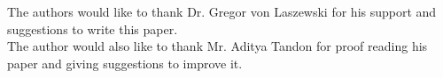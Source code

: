 \documentclass[sigconf]{acmart}
\begin{document}
\begin{acks}

The authors would like to thank Dr. Gregor von Laszewski for his support and suggestions to write this paper.
\\
The author would also like to thank Mr. Aditya Tandon for proof reading his paper and giving suggestions to improve it.

\end{acks}


 

\appendix

% 
\end{document}
